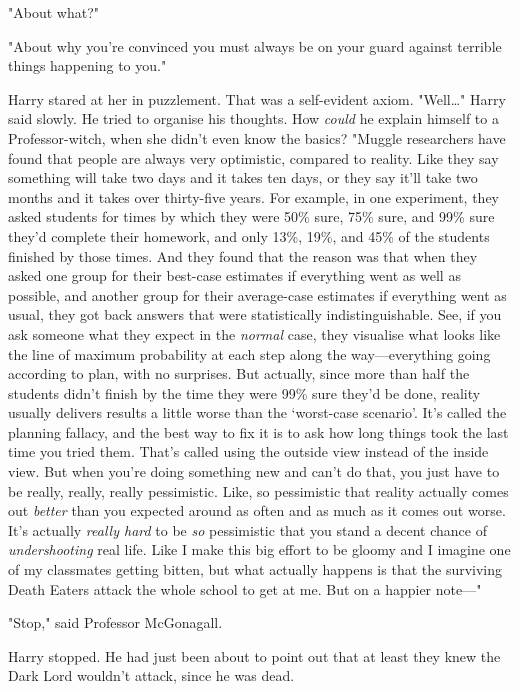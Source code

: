 "About what?"

"About why you're convinced you must always be on your guard against terrible
things happening to you."

Harry stared at her in puzzlement. That was a self-evident axiom.
"Well{\ldots}" Harry said slowly. He tried to organise his thoughts. How
\emph{could} he explain himself to a Professor-witch, when she didn't even know
the basics? "Muggle researchers have found that people are always very
optimistic, compared to reality. Like they say something will take two days and
it takes ten days, or they say it'll take two months and it takes over
thirty-five years. For example, in one experiment, they asked students for
times by which they were 50\% sure, 75\% sure, and 99\% sure they'd complete their
homework, and only 13\%, 19\%, and 45\% of the students finished by those times.
And they found that the reason was that when they asked one group for their
best-case estimates if everything went as well as possible, and another group
for their average-case estimates if everything went as usual, they got back
answers that were statistically indistinguishable. See, if you ask someone what
they expect in the \emph{normal} case, they visualise what looks like the line
of maximum probability at each step along the way---everything going according
to plan, with no surprises. But actually, since more than half the students
didn't finish by the time they were 99\% sure they'd be done, reality usually
delivers results a little worse than the `worst-case scenario'. It's called the
planning fallacy, and the best way to fix it is to ask how long things took the
last time you tried them. That's called using the outside view instead of the
inside view. But when you're doing something new and can't do that, you just
have to be really, really, really pessimistic. Like, so pessimistic that
reality actually comes out \emph{better} than you expected around as often and
as much as it comes out worse. It's actually \emph{really hard} to be \emph{so}
pessimistic that you stand a decent chance of \emph{undershooting} real life.
Like I make this big effort to be gloomy and I imagine one of my classmates
getting bitten, but what actually happens is that the surviving Death Eaters
attack the whole school to get at me. But on a happier note---"

"Stop," said Professor McGonagall.

Harry stopped. He had just been about to point out that at least they knew the
Dark Lord wouldn't attack, since he was dead.

